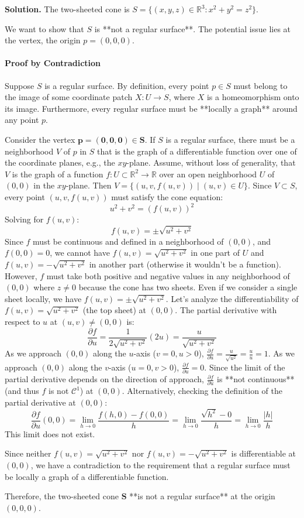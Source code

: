 \documentclass[12pt, a4paper, oneside]{article}
\newenvironment{solution}
  {\par\noindent\textbf{Solution. }\newline}
  {\par}
\begin{document}
\begin{solution}
The two-sheeted cone is $S=\{(x,y,z)\in\mathbb{R}^{3}:x^{2}+y^{2}=z^{2}\}$.

We want to show that $S$ is **not a regular surface**. The potential issue lies at the vertex, the origin $p=(0,0,0)$.

\paragraph{Proof by Contradiction}
Suppose $S$ is a regular surface. By definition, every point $p \in S$ must belong to the image of some coordinate patch $X: U \to S$, where $X$ is a homeomorphism onto its image. Furthermore, every regular surface must be **locally a graph** around any point $p$.

Consider the vertex $\mathbf{p=(0,0,0) \in S}$. If $S$ is a regular surface, there must be a neighborhood $V$ of $p$ in $S$ that is the graph of a differentiable function over one of the coordinate planes, e.g., the $xy$-plane.
Assume, without loss of generality, that $V$ is the graph of a function $f: U \subset \mathbb{R}^2 \to \mathbb{R}$ over an open neighborhood $U$ of $(0,0)$ in the $xy$-plane.
Then $V = \{(u, v, f(u,v)) \mid (u,v) \in U\}$.
Since $V \subset S$, every point $(u, v, f(u,v))$ must satisfy the cone equation:
$$
u^2 + v^2 = (f(u,v))^2
$$
Solving for $f(u,v)$:
$$
f(u,v) = \pm \sqrt{u^2+v^2}
$$
Since $f$ must be continuous and defined in a neighborhood of $(0,0)$, and $f(0,0)=0$, we cannot have $f(u,v) = \sqrt{u^2+v^2}$ in one part of $U$ and $f(u,v) = -\sqrt{u^2+v^2}$ in another part (otherwise it wouldn't be a function). However, $f$ must take both positive and negative values in any neighborhood of $(0,0)$ where $z \neq 0$ because the cone has two sheets.
Even if we consider a single sheet locally, we have $f(u,v) = \pm \sqrt{u^2+v^2}$.
Let's analyze the differentiability of $f(u,v) = \sqrt{u^2+v^2}$ (the top sheet) at $(0,0)$.
The partial derivative with respect to $u$ at $(u,v) \neq (0,0)$ is:
$$
\frac{\partial f}{\partial u} = \frac{1}{2\sqrt{u^2+v^2}} (2u) = \frac{u}{\sqrt{u^2+v^2}}
$$
As we approach $(0,0)$ along the $u$-axis ($v=0, u>0$), $\frac{\partial f}{\partial u} = \frac{u}{\sqrt{u^2}} = \frac{u}{u} = 1$.
As we approach $(0,0)$ along the $v$-axis ($u=0, v>0$), $\frac{\partial f}{\partial u} = 0$.
Since the limit of the partial derivative depends on the direction of approach, $\frac{\partial f}{\partial u}$ is **not continuous** (and thus $f$ is not $\mathcal{C}^1$) at $(0,0)$.
Alternatively, checking the definition of the partial derivative at $(0,0)$:
$$
\frac{\partial f}{\partial u}(0,0) = \lim_{h \to 0} \frac{f(h,0) - f(0,0)}{h} = \lim_{h \to 0} \frac{\sqrt{h^2} - 0}{h} = \lim_{h \to 0} \frac{|h|}{h}
$$
This limit does not exist.

Since neither $f(u,v) = \sqrt{u^2+v^2}$ nor $f(u,v) = -\sqrt{u^2+v^2}$ is differentiable at $(0,0)$, we have a contradiction to the requirement that a regular surface must be locally a graph of a differentiable function.

Therefore, the two-sheeted cone $\mathbf{S}$ **is not a regular surface** at the origin $(0,0,0)$.
\end{solution}
\end{document}
